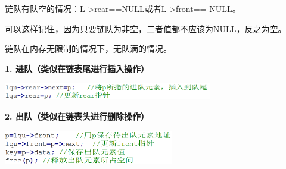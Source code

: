 链队有队空的情况：L-\textgreater{}rear==NULL或者L-\textgreater{}front==
NULL。

可以这样记住，因为只要链队为非空，二者值都不应该为NULL，反之为空。

链队在内存无限制的情况下，无队满的情况。

\textbf{1. 进队（类似在链表尾进行插入操作）}

\includegraphics[width=3.59375in,height=0.29167in]{png-jpeg-pics/3206F0D598775FA50B01A619C98149DD.png}

\textbf{2. 出队（类似在链表头进行删除操作）}

\textbf{\includegraphics[width=2.91667in,height=0.59375in]{png-jpeg-pics/09CCBBEDE3B087877C02A1E27C117DF0.png}\\
}
